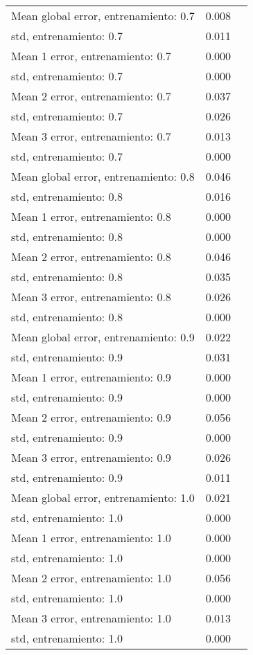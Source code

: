\begin{longtable}{p{4cm}|p{1.5cm}|p{1.5cm}}
Mean global error, entrenamiento: 0.7 &              0.008 \\
std, entrenamiento: 0.7               &              0.011 \\
Mean 1 error, entrenamiento: 0.7      &              0.000 \\
std, entrenamiento: 0.7               &              0.000 \\
Mean 2 error, entrenamiento: 0.7      &              0.037 \\
std, entrenamiento: 0.7               &              0.026 \\
Mean 3 error, entrenamiento: 0.7      &              0.013 \\
std, entrenamiento: 0.7               &              0.000 \\
Mean global error, entrenamiento: 0.8 &              0.046 \\
std, entrenamiento: 0.8               &              0.016 \\
Mean 1 error, entrenamiento: 0.8      &              0.000 \\
std, entrenamiento: 0.8               &              0.000 \\
Mean 2 error, entrenamiento: 0.8      &              0.046 \\
std, entrenamiento: 0.8               &              0.035 \\
Mean 3 error, entrenamiento: 0.8      &              0.026 \\
std, entrenamiento: 0.8               &              0.000 \\
Mean global error, entrenamiento: 0.9 &              0.022 \\
std, entrenamiento: 0.9               &              0.031 \\
Mean 1 error, entrenamiento: 0.9      &              0.000 \\
std, entrenamiento: 0.9               &              0.000 \\
Mean 2 error, entrenamiento: 0.9      &              0.056 \\
std, entrenamiento: 0.9               &              0.000 \\
Mean 3 error, entrenamiento: 0.9      &              0.026 \\
std, entrenamiento: 0.9               &              0.011 \\
Mean global error, entrenamiento: 1.0 &              0.021 \\
std, entrenamiento: 1.0               &              0.000 \\
Mean 1 error, entrenamiento: 1.0      &              0.000 \\
std, entrenamiento: 1.0               &              0.000 \\
Mean 2 error, entrenamiento: 1.0      &              0.056 \\
std, entrenamiento: 1.0               &              0.000 \\
Mean 3 error, entrenamiento: 1.0      &              0.013 \\
std, entrenamiento: 1.0               &              0.000 \\
\end{longtable}
